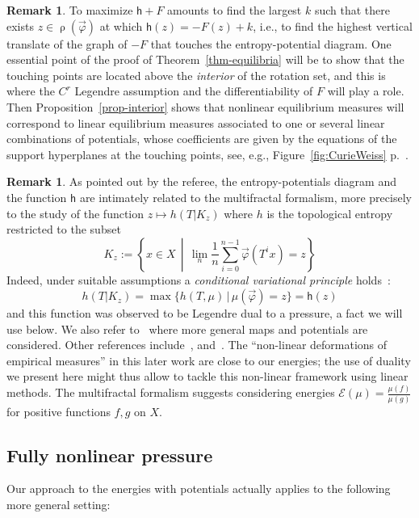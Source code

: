 \documentclass[10pt]{amsart}
\theoremstyle{definition}\newtheorem{defi}[theo]{Definition}\newtheorem{rema}[theo]{Remark}\newtheorem{exam}[theo]{Example}\newtheorem{exem}[theo]{Example}\newtheorem{nota}[theo]{Notation}
\theoremstyle{plain}
\theoremstyle{plain}
\newcommand\vpot{\vec\pot}
\newcommand{\rs}{\operatorname{\rho}}
\newcommand{\hf}{\mathsf{h}}
\newcommand{\pot}{\varphi}
\newcounter{In}
\newcommand*\8{\infty}
\newcommand{\En}{\mathcal{E}}
\begin{document}
\begin{rema}
To maximize $\hf+F$ amounts to find the largest $k$ such that there exists $ z\in\rs(\vpot)$ at which $\hf(z) = -F(z)+k$, i.e., to find the highest vertical translate of the graph of $-F$ that touches the entropy-potential diagram. One essential point of the proof of Theorem~\ref{thm-equilibria} will be to show that the touching points are located above the \emph{interior} of the rotation set, and this is where the $C^r$ Legendre assumption and the differentiability of $F$ will play a role. Then Proposition~\ref{prop-interior} shows that nonlinear equilibrium measures will correspond to linear equilibrium measures associated to one or several linear combinations of potentials, whose coefficients are given by the equations of the support hyperplanes at the touching points, see, e.g., Figure~\ref{fig:CurieWeiss} p.~\pageref{fig:CurieWeiss}.
\end{rema}


\begin{rema}\label{r:multifractal}
As pointed out by the referee, the entropy-potentials diagram and the function $\hf$ are intimately related to the multifractal formalism, more precisely to the study of the function $z \mapsto h(T|K_z)$ where $h$ is the topological entropy restricted to the subset
\[
K_z := \left\{x\in X \,\middle|\, \lim_n \frac1n\sum_{i=0}^{n-1}\vec\varphi\left(T^i x\right) = z \right\}
\]
Indeed, under suitable assumptions a \emph{conditional variational principle} holds~\cite{BarreiraSaussolSchmeling2002}:
\[
h(T|K_z) = \max\big\{ h(T,\mu) \,\big|\, \mu(\vec\varphi) = z \big\} = \hf(z)
\]
and this function was observed to be Legendre dual to a pressure, a fact we will use below. We also refer to~\cite{PfisterSullivan2007,TakensVerbitskiy2003} where more general maps and potentials are considered. Other references include~\cite{BarreiraSaussol2001,Climenhaga2013,Olivier1998}, and~\cite{Olsen2003}. The ``non-linear deformations of empirical measures'' in this later work are close to our energies; the use of duality we present here might thus allow to tackle this non-linear framework using linear methods. The multifractal formalism suggests considering energies $\En(\mu)=\frac{\mu(f)}{\mu(g)}$ for positive functions $f, g$ on $X$.
\end{rema}



\subsection{Fully nonlinear pressure}
Our approach to the energies with potentials actually applies to the following more general setting:
\end{document}
